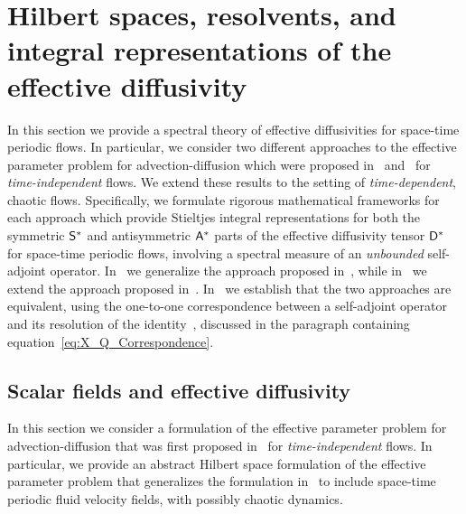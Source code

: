 \documentclass[amsa]{ipart}
\begin{document}
\section{Hilbert spaces, resolvents, and integral representations of the effective diffusivity}
\label{app:Hilbert_Resolvent_Integral_Reps} 
%
In this section we provide a spectral theory of effective
diffusivities for space-time periodic flows. In particular, we
consider two different approaches to the effective parameter problem
for advection-diffusion which were proposed
in~\cite{Pavliotis:PHD_Thesis,Bhattacharya:AAP:1999:951}   
and~\cite{Avellaneda:PRL-753,Avellaneda:CMP-339} for
\emph{time-independent} flows. We extend these results to the
setting of \emph{time-dependent}, chaotic flows. Specifically, we
formulate rigorous mathematical 
frameworks for each approach which provide Stieltjes integral
representations for both the symmetric $\mathsf{S}^*$ and antisymmetric
$\mathsf{A}^*$ parts of the effective diffusivity tensor $\mathsf{D}^*$ for
space-time periodic flows, involving a spectral measure of an
\emph{unbounded} self-adjoint operator. In~
we generalize the approach proposed
in~\cite{Pavliotis:PHD_Thesis}, 
while in~ we extend the approach
proposed
in~\cite{Avellaneda:PRL-753,Avellaneda:CMP-339}. In~
we establish that the two approaches are equivalent, using the
one-to-one correspondence between a self-adjoint operator and its
resolution of the identity~\cite{Stone:64}, discussed in the paragraph
containing equation~\eqref{eq:X_Q_Correspondence}.   



\subsection{Scalar fields and effective diffusivity}\label{app:Scalar_Fields}
%
In this section we consider a formulation of the effective parameter
problem for advection-diffusion that was first proposed
in~\cite{Pavliotis:PHD_Thesis,Bhattacharya:AAP:1999:951} for
\emph{time-independent} flows. In particular, we provide an abstract
Hilbert space formulation of the effective parameter problem that
generalizes the formulation in~\cite{Pavliotis:PHD_Thesis} to include
space-time periodic fluid velocity fields, with possibly chaotic
dynamics. 
\end{document}
